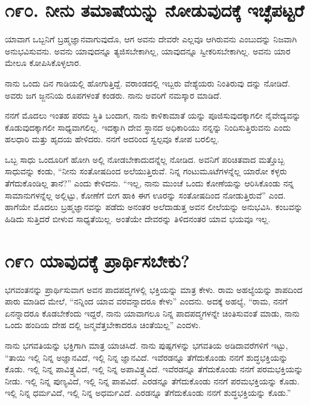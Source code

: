 \section{\num{೧೯೦. } ನೀನು ತಮಾಷೆಯನ್ನು ನೋಡುವುದಕ್ಕೆ ಇಚ್ಛೆಪಟ್ಟರೆ}

ಯಾವಾಗ ಒಬ್ಬನಿಗೆ ಬ್ರಹ್ಮಜ್ಞಾನವಾಗುವುದೊ, ಆಗ ಅವನು ದೇವರೇ ಎಲ್ಲವೂ ಆಗಿರುವನು ಎಂಬುದನ್ನು ನಿಜವಾಗಿ ಅನುಭವಿಸುವನು. ಅವನು ಯಾವುದನ್ನೂ ತ್ಯಜಿಸಬೇಕಾಗಿಲ್ಲ, ಯಾವುದನ್ನೂ ಸ್ವೀಕರಿಸಬೇಕಾಗಿಲ್ಲ. ಅವನು ಯಾರ ಮೇಲೂ ಕೋಪಿಸಿಕೊಳ್ಳಲಾರ.

ನಾನು ಒಂದು ದಿನ ಗಾಡಿಯಲ್ಲಿ ಹೋಗುತ್ತಿದ್ದೆ. ವರಾಂಡದಲ್ಲಿ ಇಬ್ಬರು ವೇಶ್ಯೆಯರು ನಿಂತಿರುವು ದನ್ನು ನೋಡಿದೆ. ಅವರು ಜಗ ಜ್ಜನನಿಯ ರೂಪಗಳಂತೆ ಕಂಡರು. ನಾನು ಅವರಿಗೆ ನಮಸ್ಕಾರ ಮಾಡಿದೆ.

ನನಗೆ ಮೊದಲು ಇಂತಹ ಪರಮ ಸ್ಥಿತಿ ಬಂದಾಗ, ನಾನು ಕಾಳಿಕಾಮಾತೆ ಯನ್ನು ಪೂಜಿಸುವುದಕ್ಕಾಗಲೀ ನೈವೇದ್ಯವನ್ನು ಕೊಡುವುದಕ್ಕಾಗಲೀ ಸಾಧ್ಯವಾಗಲಿಲ್ಲ. ಇದಕ್ಕಾಗಿ ದೇವ ಸ್ಥಾನದ ಅಧಿಕಾರಿಯು ನನ್ನನ್ನು ನಿಂದಿಸುತ್ತಿರುವನು ಎಂದು ಹಲಧಾರಿ ಮತ್ತು ಹೃದಯ ಹೇಳಿದರು. ನನಗೆ ಅದರಿಂದ ಸ್ವಲ್ಪವೂ ಕೋಪ ಬರಲಿಲ್ಲ.

ಒಬ್ಬ ಸಾಧು ಒಂದೂರಿಗೆ ಹೋಗಿ ಅಲ್ಲಿ ನೋಡಬೇಕಾದುದನ್ನೆಲ್ಲ ನೋಡಿದ. ಅವನಿಗೆ ಪರಿಚಿತವಾದ ಮತ್ತೊಬ್ಬ ಸಾಧುವನ್ನು ಕಂಡು, “ನೀನು ಸಂತೋಷದಿಂದ ಅಲೆಯುತ್ತಿರುವೆ. ನಿನ್ನ ಗಂಟುಮೂಟೆಗಳನ್ನೆಲ್ಲ ಯಾರೋ ಕಳ್ಳರು ತೆಗೆದುಕೊಂಡಿಲ್ಲ ತಾನೆ?” ಎಂದು ಕೇಳಿದನು. “ಇಲ್ಲ, ನಾನು ಮುಂಚೆ ಒಂದು ಕೋಣೆಯನ್ನು ಆರಿಸಿಕೊಂಡು ನನ್ನ ಸಾಮಾನುಗಳನ್ನೆಲ್ಲ ಅಲ್ಲಿಟ್ಟು, ಕೋಣೆಗೆ ಬೀಗ ಹಾಕಿ ಈಗ ಊರನ್ನು ಸಂತೋಷದಿಂದ ನೋಡುತ್ತಿರುವೆ” ಎಂದ. ಹಾಗೆಯೇ ಮೊದಲು ಬ್ರಹ್ಮಜ್ಞಾನವನ್ನು ಪಡೆದು ಅನಂತರ ಅಲೆದಾಡುತ್ತ ಅವನ ಲೀಲೆಯನ್ನು ಅನುಭವಿಸಿ. ಕಂಬವನ್ನು ಹಿಡಿದು ಸುತ್ತಿದರೆ ಬೀಳುವ ಸಾಧ್ಯತೆಯಿಲ್ಲ. ಅಂತೆಯೇ ದೇವರನ್ನು ತಿಳಿದನಂತರ ಯಾವ ಭಯವೂ ಇಲ್ಲ.


\section{\num{೧೯೧ } ಯಾವುದಕ್ಕೆ ಪ್ರಾರ್ಥಿಸಬೇಕು?}

ಭಗವಂತನನ್ನು ಪ್ರಾರ್ಥಿಸುವಾಗ ಅವನ ಪಾದಪದ್ಮಗಳಲ್ಲಿ ಭಕ್ತಿಯನ್ನು ಮಾತ್ರ ಕೇಳು. ರಾಮ ಅಹಲ್ಯೆಯನ್ನು ಶಾಪದಿಂದ ಪಾರು ಮಾಡಿದ ಮೇಲೆ, “ನನ್ನಿಂದ ಯಾವ ವರವನ್ನಾದರೂ ಕೇಳು” ಎಂದನು. ಅದಕ್ಕೆ ಅಹಲ್ಯೆ, “ರಾಮ, ನನಗೆ ಏನನ್ನಾದರೂ ಕೊಡಬೇಕೆಂದು ಇದ್ದರೆ, ನಾನು ಯಾವಾಗಲೂ ನಿನ್ನ ಪಾದಪದ್ಮಗಳನ್ನೇ ಚಿಂತಿಸುವಂತೆ ಮಾಡು, ನಾನು ಒಂದು ಹಂದಿಯ ದೇಹ ದಲ್ಲಿ ಜನ್ಮವೆತ್ತಬೇಕಾದರೂ ಚಿಂತೆಯಿಲ್ಲ” ಎಂದಳು.

ನಾನು ಭಗವತಿಯನ್ನು ಭಕ್ತಿಗಾಗಿ ಮಾತ್ರ ಯಾಚಿಸಿದೆ. ನಾನು ಪುಷ್ಪಗಳನ್ನು ಭಗವತಿಯ ಅಡಿದಾವರೆಗಳಿಗೆ ಇಟ್ಟು, “ತಾಯಿ ಇಲ್ಲಿ ನಿನ್ನ ಅಜ್ಞಾನವಿದೆ, ಇಲ್ಲಿ ನಿನ್ನ ಜ್ಞಾನವಿದೆ. ಇವೆರಡನ್ನೂ ತೆಗೆದುಕೊಂಡು ನನಗೆ ಶುದ್ಧಭಕ್ತಿಯನ್ನು ಕೊಡು. ಇಲ್ಲಿ ನಿನ್ನ ಪಾವಿತ್ರ್ಯವಿದೆ, ಇಲ್ಲಿ ನಿನ್ನ ಅಪಾವಿತ್ರ್ಯವಿದೆ. ಇವೆರಡನ್ನೂ ತೆಗೆದುಕೊಂಡು ನನಗೆ ಪರಮಭಕ್ತಿಯನ್ನು ನೀಡು. ಇಲ್ಲಿ ನಿನ್ನ ಪುಣ್ಯವಿದೆ, ಇಲ್ಲಿ ನಿನ್ನ ಪಾಪವಿದೆ. ಎರಡನ್ನೂ ತೆಗೆದುಕೊಂಡು ನನಗೆ ಪರಮಭಕ್ತಿಯನ್ನು ಕೊಡು. ಇಲ್ಲಿ ನಿನ್ನ ಧರ್ಮವಿದೆ, ಇಲ್ಲಿ ನಿನ್ನ ಅಧರ್ಮವಿದೆ. ಎರಡನ್ನೂ ತೆಗೆದುಕೊಂಡು ನನಗೆ ಶುದ್ಧಭಕ್ತಿಯನ್ನು ಕೊಡು.”


